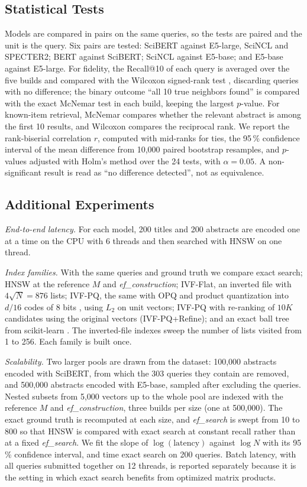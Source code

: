 \documentclass[conference, letterpaper]{IEEEtran}
\newcommand{\efc}{\textit{ef\_construction}}
\newcommand{\efs}{\textit{ef\_search}}
\begin{document}
\subsection{Statistical Tests}

Models are compared in pairs on the same queries, so the tests are paired and the unit is the query. Six pairs are tested: SciBERT against E5-large, SciNCL and SPECTER2; BERT against SciBERT; SciNCL against E5-base; and E5-base against E5-large. For fidelity, the Recall@10 of each query is averaged over the five builds and compared with the Wilcoxon signed-rank test \cite{wilcoxon1945}, discarding queries with no difference; the binary outcome ``all 10 true neighbors found'' is compared with the exact McNemar test \cite{mcnemar1947} in each build, keeping the largest $p$-value. For known-item retrieval, McNemar compares whether the relevant abstract is among the first 10 results, and Wilcoxon compares the reciprocal rank. We report the rank-biserial correlation $r$, computed with mid-ranks for ties, the 95\,\% confidence interval of the mean difference from 10,000 paired bootstrap resamples, and $p$-values adjusted with Holm's method \cite{holm1979} over the 24 tests, with $\alpha=0.05$. A non-significant result is read as ``no difference detected'', not as equivalence.

\subsection{Additional Experiments}

\textit{End-to-end latency.} For each model, 200 titles and 200 abstracts are encoded one at a time on the CPU with 6 threads and then searched with HNSW on one thread.

\textit{Index families.} With the same queries and ground truth we compare exact search; HNSW at the reference $M$ and \efc{}; IVF-Flat, an inverted file with $4\sqrt{N}=876$ lists; IVF-PQ, the same with OPQ and product quantization into $d/16$ codes of 8 bits \cite{jegou2011,ge2014}, using $L_2$ on unit vectors; IVF-PQ with re-ranking of $10K$ candidates using the original vectors (IVF-PQ+Refine); and an exact ball tree from scikit-learn \cite{omohundro1989}. The inverted-file indexes sweep the number of lists visited from 1 to 256. Each family is built once.

\textit{Scalability.} Two larger pools are drawn from the dataset: 100,000 abstracts encoded with SciBERT, from which the 303 queries they contain are removed, and 500,000 abstracts encoded with E5-base, sampled after excluding the queries. Nested subsets from 5,000 vectors up to the whole pool are indexed with the reference $M$ and \efc{}, three builds per size (one at 500,000). The exact ground truth is recomputed at each size, and \efs{} is swept from 10 to 800 so that HNSW is compared with exact search at constant recall rather than at a fixed \efs{}. We fit the slope of $\log(\text{latency})$ against $\log N$ with its 95\,\% confidence interval, and time exact search on 200 queries. Batch latency, with all queries submitted together on 12 threads, is reported separately because it is the setting in which exact search benefits from optimized matrix products.
\end{document}

